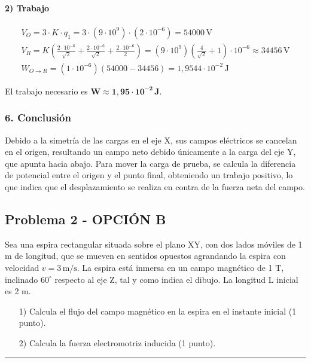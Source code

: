 \paragraph{2) Trabajo}
\begin{gather}
    V_O = 3 \cdot K \cdot q_1 = 3 \cdot (9\cdot10^9) \cdot (2\cdot10^{-6}) = 54000\,\text{V} \\
    V_R = K\left(\frac{2\cdot10^{-6}}{\sqrt{2}} + \frac{2\cdot10^{-6}}{\sqrt{2}} + \frac{2\cdot10^{-6}}{2}\right) = (9\cdot10^9)\left(\frac{4}{\sqrt{2}} + 1\right)\cdot10^{-6} \approx 34456\,\text{V} \\
    W_{O \to R} = (1\cdot10^{-6})(54000 - 34456) = 1,9544\cdot10^{-2}\,\text{J}
\end{gather}
\begin{cajaresultado}
El trabajo necesario es $\boldsymbol{W \approx 1,95 \cdot 10^{-2} \, \textbf{J}}$.
\end{cajaresultado}

\subsubsection*{6. Conclusión}
\begin{cajaconclusion}
Debido a la simetría de las cargas en el eje X, sus campos eléctricos se cancelan en el origen, resultando un campo neto debido únicamente a la carga del eje Y, que apunta hacia abajo. Para mover la carga de prueba, se calcula la diferencia de potencial entre el origen y el punto final, obteniendo un trabajo positivo, lo que indica que el desplazamiento se realiza en contra de la fuerza neta del campo.
\end{cajaconclusion}

\newpage

\subsection{Problema 2 - OPCIÓN B}
\label{subsec:4B_2008_jun_ord}
\begin{cajaenunciado}
Sea una espira rectangular situada sobre el plano XY, con dos lados móviles de 1 m de longitud, que se mueven en sentidos opuestos agrandando la espira con velocidad $v=3\,\text{m/s}$. La espira está inmersa en un campo magnético de 1 T, inclinado $60^\circ$ respecto al eje Z, tal y como indica el dibujo. La longitud L inicial es 2 m.
\begin{enumerate}
    \item[1)] Calcula el flujo del campo magnético en la espira en el instante inicial (1 punto).
    \item[2)] Calcula la fuerza electromotriz inducida (1 punto).
\end{enumerate}
\end{cajaenunciado}
\hrule

